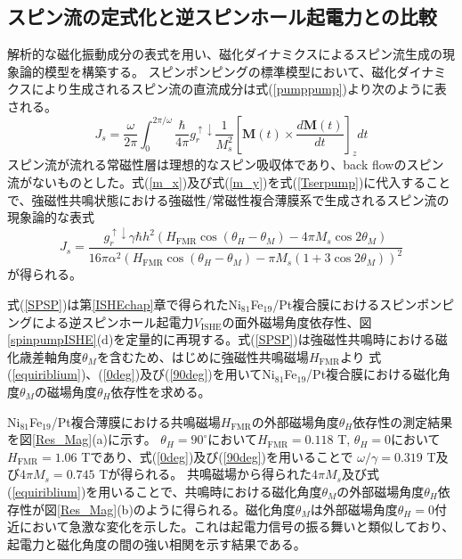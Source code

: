 \subsection{スピン流の定式化と逆スピンホール起電力との比較}
解析的な磁化振動成分の表式を用い、磁化ダイナミクスによるスピン流生成の現象論的模型を構築する。
スピンポンピングの標準模型において、磁化ダイナミクスにより生成されるスピン流の直流成分は式(\ref{pumppump})より次のように表される。
\begin{equation}
J_s= \frac{\omega}{2\pi}\int^{2\pi/\omega}_0\frac{\hbar}{4\pi}g^{\uparrow\downarrow}_r \frac{1}{M_s^2}\left[{\bm M}(t)\times\frac{d{\bm  M}(t)}{dt}\right]_z dt \label{Tserpump}
\end{equation}
スピン流が流れる常磁性層は理想的なスピン吸収体であり、back flowのスピン流がないものとした。式(\ref{m_x})及び式(\ref{m_y})を式(\ref{Tserpump})に代入することで、強磁性共鳴状態における強磁性/常磁性複合薄膜系で生成されるスピン流の現象論的な表式
\begin{equation}
J_s=\frac{g^{\uparrow\downarrow}_r \gamma  \hbar h^2 \left(H_\text{FMR}\cos(\theta_H-\theta_M)-4\pi M_s\cos2\theta_M\right)}{16\pi\alpha^2\left(H_\text{FMR}\cos(\theta_H-\theta_M)-\pi M_s\left(1+3\cos2\theta_M\right)\right)^2}\label{SPSP}
\end{equation}
が得られる。


式(\ref{SPSP})は第\ref{ISHEchap}章で得られたNi$_{81}$Fe$_{19}$/Pt複合膜におけるスピンポンピングによる逆スピンホール起電力$V_\text{ISHE}$の面外磁場角度依存性、図\ref{spinpumpISHE}(d)を定量的に再現する。式(\ref{SPSP})は強磁性共鳴時における磁化歳差軸角度$\theta_M$を含むため、はじめに強磁性共鳴磁場$H_\text{FMR}$より
式(\ref{equiriblium})、(\ref{0deg})及び(\ref{90deg})を用いてNi$_{81}$Fe$_{19}$/Pt複合膜における磁化角度$\theta_M$の磁場角度$\theta_H$依存性を求める。

Ni$_{81}$Fe$_{19}$/Pt複合薄膜における共鳴磁場$H_\text{FMR}$の外部磁場角度$\theta_H$依存性の測定結果を図\ref{Res_Mag}(a)に示す。
$\theta_H=90^\circ$において$H_\text{FMR}=0.118$ T, $\theta_H=0$において$H_\text{FMR}=1.06$ Tであり、式(\ref{0deg})及び(\ref{90deg})を用いることで
$\omega/\gamma=0.319$ T及び$4\pi M_s=0.745$ Tが得られる。
共鳴磁場から得られた$4\pi M_s$及び式(\ref{equiriblium})を用いることで、共鳴時における磁化角度$\theta_M$の外部磁場角度$\theta_H$依存性が図\ref{Res_Mag}(b)のように得られる。磁化角度$\theta_M$は外部磁場角度$\theta_H=0$付近において急激な変化を示した。これは起電力信号の振る舞いと類似しており、起電力と磁化角度の間の強い相関を示す結果である。

